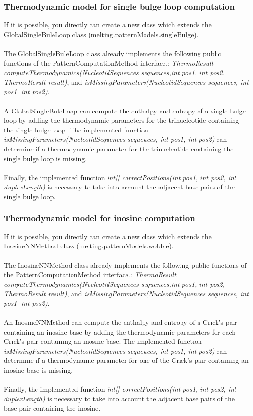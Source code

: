 \documentclass{article}
\begin{document}
\subsubsection{Thermodynamic model for single bulge loop computation}

If it is possible, you directly can create a new class which extends the GlobalSingleBuleLoop class 
(melting.patternModels.singleBulge).\\
\\
The GlobalSingleBuleLoop class already implements the following public functions of the PatternComputationMethod interface.: 
\textit{ThermoResult computeThermodynamics(NucleotidSequences sequences,int pos1, int pos2, ThermoResult result)},
and \textit{isMissingParameters(NucleotidSequences sequences, int pos1, int pos2)}. \\
\\
A GlobalSingleBuleLoop can compute the enthalpy and entropy of a single bulge loop by adding
the thermodynamic parameters for the trinucleotide containing the single bulge loop. 
The implemented function \textit{isMissingParameters(NucleotidSequences sequences, int pos1, int pos2)} 
can determine if a thermodynamic parameter for the trinucleotide containing the single bulge loop is missing. \\
\\
Finally, the implemented function \textit{int[] correctPositions(int pos1, int pos2, int duplexLength)} is necessary
to take into account the adjacent base pairs of the single bulge loop.

\subsubsection{Thermodynamic model for inosine computation}

If it is possible, you directly can create a new class which extends the InosineNNMethod class 
(melting.patternModels.wobble). \\
\\
The InosineNNMethod class already implements the following public functions of the PatternComputationMethod interface.: 
\textit{ThermoResult computeThermodynamics(NucleotidSequences sequences,int pos1, int pos2, ThermoResult result)},
and \textit{isMissingParameters(NucleotidSequences sequences, int pos1, int pos2)}. \\
\\
An InosineNNMethod can compute the enthalpy and entropy of a Crick's pair containing an inosine base by adding
the thermodynamic parameters for each Crick's pair containing an inosine base. 
The implemented function \textit{isMissingParameters(NucleotidSequences sequences, int pos1, int pos2)} 
can determine if a thermodynamic parameter for one of the Crick's pair containing an inosine base is missing. \\
\\
Finally, the implemented function \textit{int[] correctPositions(int pos1, int pos2, int duplexLength)} is necessary
to take into account the adjacent base pairs of the base pair containing the inosine.
\end{document}
